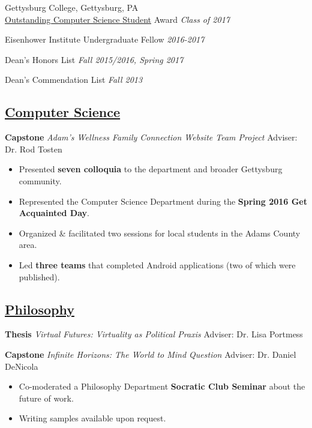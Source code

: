 \documentclass[11pt]{article}
\begin{document}
Gettysburg College, Gettysburg, PA \\

\href{http://www.gettysburg.edu/academics/cs/programs/honors.dot}{Outstanding Computer Science Student} Award \hfill \textit{Class of 2017}

Eisenhower Institute Undergraduate Fellow 
\hfill
\textit{2016-2017}

Dean's Honors List \hfill \textit{Fall 2015/2016, Spring 2017}

Dean's Commendation List \hfill \textit{Fall 2013}

\subsection*{\underline{Computer Science}}
\textbf{Capstone} \textit{Adam's Wellness Family Connection Website Team Project} \hfill Adviser: Dr. Rod Tosten
\begin{itemize}[noitemsep]
	\item Presented \textbf{seven colloquia} to the department and broader Gettysburg community.
	\item Represented the Computer Science Department during the \textbf{Spring 2016 Get Acquainted Day}. 
	\item Organized \& facilitated two  sessions for local students in the Adams County area.
	\item Led \textbf{three teams} that completed Android applications (two of which were published).
\end{itemize}

\subsection*{\underline{Philosophy}}
\textbf{Thesis} \textit{Virtual Futures: Virtuality as Political Praxis} \hfill Adviser: Dr. Lisa Portmess

\textbf{Capstone} \textit{Infinite Horizons: The World to Mind Question} \hfill Adviser: Dr. Daniel DeNicola
\begin{itemize}[noitemsep]
	\item Co-moderated a Philosophy Department \textbf{Socratic Club Seminar} about the future of work.
	\item Writing samples available upon request.
\end{itemize}
\end{document}
